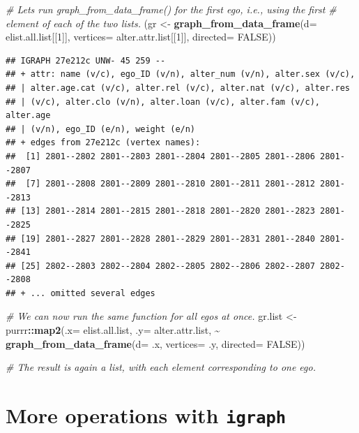 \documentclass[
]{book}
\newenvironment{Shaded}{\begin{snugshade}}{\end{snugshade}}
\newcommand{\AttributeTok}[1]{\textcolor[rgb]{0.13,0.29,0.53}{#1}}
\newcommand{\CommentTok}[1]{\textcolor[rgb]{0.56,0.35,0.01}{\textit{#1}}}
\newcommand{\ConstantTok}[1]{\textcolor[rgb]{0.56,0.35,0.01}{#1}}
\newcommand{\DecValTok}[1]{\textcolor[rgb]{0.00,0.00,0.81}{#1}}
\newcommand{\FunctionTok}[1]{\textcolor[rgb]{0.13,0.29,0.53}{\textbf{#1}}}
\newcommand{\NormalTok}[1]{#1}
\newcommand{\OtherTok}[1]{\textcolor[rgb]{0.56,0.35,0.01}{#1}}
\newcommand{\SpecialCharTok}[1]{\textcolor[rgb]{0.81,0.36,0.00}{\textbf{#1}}}
\begin{document}
\begin{Shaded}
\begin{Highlighting}[]
\CommentTok{\# Let\textquotesingle{}s run graph\_from\_data\_frame() for the first ego, i.e., using the first}
\CommentTok{\# element of each of the two lists.}
\NormalTok{(gr }\OtherTok{\textless{}{-}} \FunctionTok{graph\_from\_data\_frame}\NormalTok{(}\AttributeTok{d=}\NormalTok{ elist.all.list[[}\DecValTok{1}\NormalTok{]], }
                             \AttributeTok{vertices=}\NormalTok{ alter.attr.list[[}\DecValTok{1}\NormalTok{]], }\AttributeTok{directed=} \ConstantTok{FALSE}\NormalTok{))}
\end{Highlighting}
\end{Shaded}

\begin{verbatim}
## IGRAPH 27e212c UNW- 45 259 -- 
## + attr: name (v/c), ego_ID (v/n), alter_num (v/n), alter.sex (v/c),
## | alter.age.cat (v/c), alter.rel (v/c), alter.nat (v/c), alter.res
## | (v/c), alter.clo (v/n), alter.loan (v/c), alter.fam (v/c), alter.age
## | (v/n), ego_ID (e/n), weight (e/n)
## + edges from 27e212c (vertex names):
##  [1] 2801--2802 2801--2803 2801--2804 2801--2805 2801--2806 2801--2807
##  [7] 2801--2808 2801--2809 2801--2810 2801--2811 2801--2812 2801--2813
## [13] 2801--2814 2801--2815 2801--2818 2801--2820 2801--2823 2801--2825
## [19] 2801--2827 2801--2828 2801--2829 2801--2831 2801--2840 2801--2841
## [25] 2802--2803 2802--2804 2802--2805 2802--2806 2802--2807 2802--2808
## + ... omitted several edges
\end{verbatim}

\begin{Shaded}
\begin{Highlighting}[]
\CommentTok{\# We can now run the same function for all egos at once.}
\NormalTok{gr.list }\OtherTok{\textless{}{-}}\NormalTok{ purrr}\SpecialCharTok{::}\FunctionTok{map2}\NormalTok{(}\AttributeTok{.x=}\NormalTok{ elist.all.list, }\AttributeTok{.y=}\NormalTok{ alter.attr.list, }
                       \SpecialCharTok{\textasciitilde{}} \FunctionTok{graph\_from\_data\_frame}\NormalTok{(}\AttributeTok{d=}\NormalTok{ .x, }\AttributeTok{vertices=}\NormalTok{ .y, }\AttributeTok{directed=} \ConstantTok{FALSE}\NormalTok{))}

\CommentTok{\# The result is again a list, with each element corresponding to one ego.}
\end{Highlighting}
\end{Shaded}

\hypertarget{more-igraph}{%
\section{\texorpdfstring{More operations with \texttt{igraph}}{More operations with igraph}}\label{more-igraph}}
\end{document}
